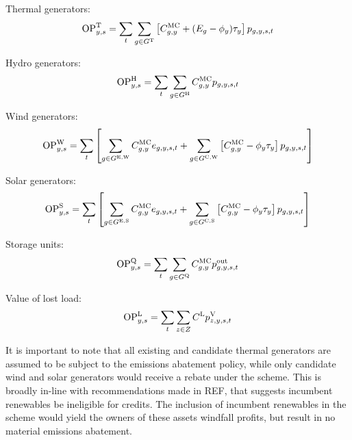 \documentclass{article}
\begin{document}
Thermal generators:
\begin{equation}
	\mathrm{OP}^{\mathrm{T}}_{y,s} = \sum\limits_{t} \sum\limits_{g \in G^{\mathrm{T}}} \left[C^{\mathrm{MC}}_{g,y} + (E_{g} - \phi_{y})\tau_{y}\right]p_{g,y,s,t}\\
\end{equation}

Hydro generators:
\begin{equation}
	\mathrm{OP}^{\mathrm{H}}_{y,s} = \sum\limits_{t}\sum\limits_{g \in G^{\mathrm{H}}}C^{\mathrm{MC}}_{g,y} p_{g,y,s,t}
\end{equation}

Wind generators:
\begin{equation}
	\mathrm{OP}^{\mathrm{W}}_{y,s} = \sum\limits_{t}\left[\sum\limits_{g \in G^{\mathrm{E,W}}} C^{\mathrm{MC}}_{g,y} e_{g,y,s,t} + \sum\limits_{g \in G^{\mathrm{C,W}}} \left[C^{\mathrm{MC}}_{g,y} - \phi_{y} \tau_{y}\right] p_{g,y,s,t}\right]
\end{equation}

Solar generators:
\begin{equation}
	\mathrm{OP}^{\mathrm{S}}_{y,s} = \sum\limits_{t}\left[\sum\limits_{g \in G^{\mathrm{E,S}}} C^{\mathrm{MC}}_{g,y} e_{g,y,s,t} + \sum\limits_{g \in G^{\mathrm{C,S}}} \left[C^{\mathrm{MC}}_{g,y} - \phi_{y}\tau_{y}\right] p_{g,y,s,t}\right]
\end{equation}

Storage units:
\begin{equation}
	\mathrm{OP}^{\mathrm{Q}}_{y,s} = \sum\limits_{t}\sum\limits_{g \in G^{\mathrm{Q}}} C^{\mathrm{MC}}_{g,y} p^{\mathrm{out}}_{g,y,s,t}
\end{equation}

Value of lost load:
\begin{equation}
	\mathrm{OP}^{\mathrm{L}}_{y,s} = \sum\limits_{t}\sum\limits_{z \in Z} C^{\mathrm{L}} p^{\mathrm{V}}_{z,y,s,t}
\end{equation}

It is important to note that all existing and candidate thermal generators are assumed to be subject to the emissions abatement policy, while only candidate wind and solar generators would receive a rebate under the scheme. This is broadly in-line with recommendations made in REF, that suggests incumbent renewables be ineligible for credits. The inclusion of incumbent renewables in the scheme would yield the owners of these assets windfall profits, but result in no material emissions abatement.
\end{document}

